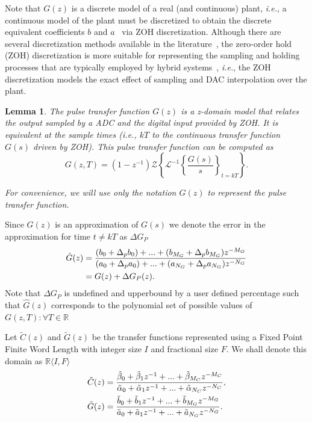 \documentclass{sig-alternate-05-2015}
\newtheorem{mylemma}{Lemma}
\begin{document}
Note that $G(z)$ is a
discrete model of a real (and continuous) plant, {\it i.e.}, a continuous
model of the plant must be discretized to obtain the discrete equivalent
coefficients $b$ and $a$~\cite{Astrom08} via ZOH discretization.
Although there are several discretization methods available in the literature~\cite{Franklin15}, the
zero-order hold (ZOH) discretization is more suitable for representing the
sampling and holding processes that are typically employed by hybrid
systems~\cite{istepanian2012digital}, {\it i.e.}, the ZOH discretization models 
the exact effect of sampling and DAC interpolation over the plant.

\begin{mylemma} \cite{astrom1997computer}
%
The pulse transfer function $G(z)$ is a z-domain model that relates the output sampled by a ADC and the digital input provided by ZOH. It is equivalent at the sample times ({\it i.e.}, $kT$ to the continuous transfer function $G(s)$ driven by ZOH).  This pulse transfer
function can be computed as
%
\begin{equation}
\label{eq:pulsetf}
G(z,T) = (1-z^{-1})\mathcal{Z}\left\lbrace{\mathcal{L}^{-1}\left\lbrace{\frac{G(s)}{s}}\right\rbrace_{t=kT}}\right\rbrace.
\end{equation}

For convenience, we will use only the notation $G(z)$ to represent the pulse transfer function.
\end{mylemma}

Since $G(z)$ is an approximation of $G(s)$ we denote the error in the approximation for time $t \neq kT$ as $\Delta{G}_P$
\begin{align}
\small
\label{parametric_plant_tf}
\hat{G}(z)&=\frac{(b_{0}+\Delta_p b_{0}) +...+(b_{M_G}+\Delta_p b_{M_G})z^{-M_G}}{(a_{0}+\Delta_p a_{0})+...+(a_{N_G}+\Delta_p a_{N_G})z^{-N_G}} \nonumber \\
&=G(z)+\Delta{G}_P(z).
\end{align}
Note that $\Delta{G}_P$ is undefined and upperbound by a user defined percentage such that $\hat{G}(z)$ corresponds to the polynomial set of possible values of $G(z, T): \forall T \in \mathbb{R}$

Let $\tilde C(z)$ and $\tilde G(z)$ be the transfer functions represented using a Fixed Point Finite Word Length with integer size $I$ and fractional size $F$. We shall denote this domain as $\mathbb{R}\langle I,F \rangle$
\begin{align}
\small
\label{digital_controller_plant_tf}
\tilde C(z)&=\frac{\tilde \beta_{0}+\tilde \beta_{1}z^{-1}+...+\tilde \beta_{M_C}z^{-M_C}}{\tilde \alpha_{0}+\tilde \alpha_{1}z^{-1}+...+\tilde \alpha_{N_C}z^{-N_C}}, \\
\tilde G(z)&=\frac{\tilde b_{0}+\tilde b_{1}z^{-1}+...+\tilde b_{M_G}z^{-M_G}}{\tilde a_{0}+\tilde a_{1}z^{-1}+...+\tilde a_{N_G}z^{-N_G}}.
\end{align}
 
\end{document}
